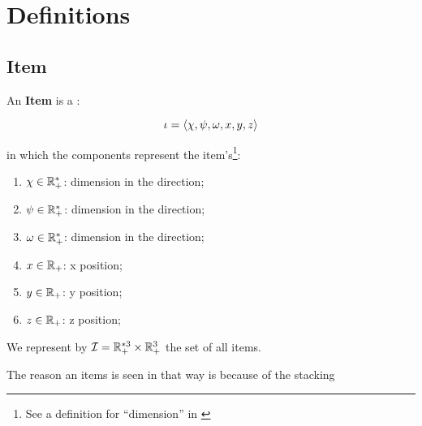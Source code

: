 \section{Definitions}

\subsection{Item}

An \textbf{Item} \itemO is a :

\begin{equation}
	\label{definition:item}
	\iota = \langle
		\chi,
		\psi,
		\omega,
		x,
		y,
		z
	\rangle
\end{equation}

in which the components represent the item's\footnote{See a definition for ``dimension'' in \cite{bib:dict-dimension}}:

\begin{enumerate}
	\item $\chi \in \mathbb{R}_{+}^{*}$: dimension in the \px direction;
	\item $\psi \in \mathbb{R}_{+}^{*}$: dimension in the \py direction;
	\item $\omega\in \mathbb{R}_{+}^{*}$: dimension in the \pz direction;
	\item $x \in \mathbb{R}_{+}$: x position;
	\item $y \in \mathbb{R}_{+}$: y position;
	\item $z \in \mathbb{R}_{+}$: z position;
\end{enumerate}

We represent by $\mathcal{I} = \mathbb{R}_{+}^{*3} \times \mathbb{R}_{+}^{3}$ the set of all items.

The reason an items is seen in that way is because of the stacking

%
%
%
%

